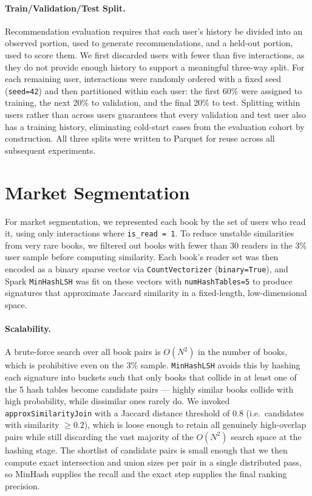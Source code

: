 \documentclass[10pt,twocolumn]{article}
\begin{document}
\paragraph{Train/Validation/Test Split.} Recommendation evaluation requires that each user's history be divided into an observed portion, used to generate recommendations, and a held-out portion, used to score them. We first discarded users with fewer than five interactions, as they do not provide enough history to support a meaningful three-way split. For each remaining user, interactions were randomly ordered with a fixed seed (\texttt{seed=42}) and then partitioned within each user: the first 60\% were assigned to training, the next 20\% to validation, and the final 20\% to test. Splitting within users rather than across users guarantees that every validation and test user also has a training history, eliminating cold-start cases from the evaluation cohort by construction. All three splits were written to Parquet for reuse across all subsequent experiments.

\section{Market Segmentation}

For market segmentation, we represented each book by the set of users who read it, using only interactions where \texttt{is\_read = 1}. To reduce unstable similarities from very rare books, we filtered out books with fewer than 30 readers in the 3\% user sample before computing similarity. Each book's reader set was then encoded as a binary sparse vector via \texttt{CountVectorizer} (\texttt{binary=True}), and Spark \texttt{MinHashLSH} was fit on these vectors with \texttt{numHashTables=5} to produce signatures that approximate Jaccard similarity in a fixed-length, low-dimensional space.

\paragraph{Scalability.} A brute-force search over all book pairs is $O(N^2)$ in the number of books, which is prohibitive even on the 3\% sample. \texttt{MinHashLSH} avoids this by hashing each signature into buckets such that only books that collide in at least one of the 5 hash tables become candidate pairs --- highly similar books collide with high probability, while dissimilar ones rarely do. We invoked \texttt{approxSimilarityJoin} with a Jaccard distance threshold of $0.8$ (i.e.\ candidates with similarity $\geq 0.2$), which is loose enough to retain all genuinely high-overlap pairs while still discarding the vast majority of the $O(N^2)$ search space at the hashing stage. The shortlist of candidate pairs is small enough that we then compute exact intersection and union sizes per pair in a single distributed pass, so MinHash supplies the recall and the exact step supplies the final ranking precision.
\end{document}
